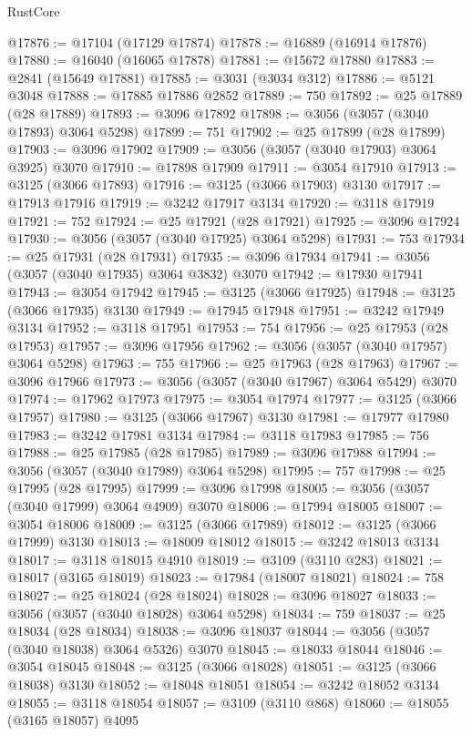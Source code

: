 \begin{lexlean}{RustCore}
\begin{coremodule}
@17876 := @17104 (@17129 @17874)
@17878 := @16889 (@16914 @17876)
@17880 := @16040 (@16065 @17878)
@17881 := @15672 @17880
@17883 := @2841 (@15649 @17881)
@17885 := @3031 (@3034 @312)
@17886 := @5121 @3048
@17888 := @17885 @17886 @2852
@17889 := 750
@17892 := @25 @17889 (@28 @17889)
@17893 := @3096 @17892
@17898 := @3056 (@3057 (@3040 @17893) @3064 @5298)
@17899 := 751
@17902 := @25 @17899 (@28 @17899)
@17903 := @3096 @17902
@17909 := @3056 (@3057 (@3040 @17903) @3064 @3925) @3070
@17910 := @17898 @17909
@17911 := @3054 @17910
@17913 := @3125 (@3066 @17893)
@17916 := @3125 (@3066 @17903) @3130
@17917 := @17913 @17916
@17919 := @3242 @17917 @3134
@17920 := @3118 @17919
@17921 := 752
@17924 := @25 @17921 (@28 @17921)
@17925 := @3096 @17924
@17930 := @3056 (@3057 (@3040 @17925) @3064 @5298)
@17931 := 753
@17934 := @25 @17931 (@28 @17931)
@17935 := @3096 @17934
@17941 := @3056 (@3057 (@3040 @17935) @3064 @3832) @3070
@17942 := @17930 @17941
@17943 := @3054 @17942
@17945 := @3125 (@3066 @17925)
@17948 := @3125 (@3066 @17935) @3130
@17949 := @17945 @17948
@17951 := @3242 @17949 @3134
@17952 := @3118 @17951
@17953 := 754
@17956 := @25 @17953 (@28 @17953)
@17957 := @3096 @17956
@17962 := @3056 (@3057 (@3040 @17957) @3064 @5298)
@17963 := 755
@17966 := @25 @17963 (@28 @17963)
@17967 := @3096 @17966
@17973 := @3056 (@3057 (@3040 @17967) @3064 @5429) @3070
@17974 := @17962 @17973
@17975 := @3054 @17974
@17977 := @3125 (@3066 @17957)
@17980 := @3125 (@3066 @17967) @3130
@17981 := @17977 @17980
@17983 := @3242 @17981 @3134
@17984 := @3118 @17983
@17985 := 756
@17988 := @25 @17985 (@28 @17985)
@17989 := @3096 @17988
@17994 := @3056 (@3057 (@3040 @17989) @3064 @5298)
@17995 := 757
@17998 := @25 @17995 (@28 @17995)
@17999 := @3096 @17998
@18005 := @3056 (@3057 (@3040 @17999) @3064 @4909) @3070
@18006 := @17994 @18005
@18007 := @3054 @18006
@18009 := @3125 (@3066 @17989)
@18012 := @3125 (@3066 @17999) @3130
@18013 := @18009 @18012
@18015 := @3242 @18013 @3134
@18017 := @3118 @18015 @4910
@18019 := @3109 (@3110 @283)
@18021 := @18017 (@3165 @18019)
@18023 := @17984 (@18007 @18021)
@18024 := 758
@18027 := @25 @18024 (@28 @18024)
@18028 := @3096 @18027
@18033 := @3056 (@3057 (@3040 @18028) @3064 @5298)
@18034 := 759
@18037 := @25 @18034 (@28 @18034)
@18038 := @3096 @18037
@18044 := @3056 (@3057 (@3040 @18038) @3064 @5326) @3070
@18045 := @18033 @18044
@18046 := @3054 @18045
@18048 := @3125 (@3066 @18028)
@18051 := @3125 (@3066 @18038) @3130
@18052 := @18048 @18051
@18054 := @3242 @18052 @3134
@18055 := @3118 @18054
@18057 := @3109 (@3110 @868)
@18060 := @18055 (@3165 @18057) @4095

\end{coremodule}
\end{lexlean}
